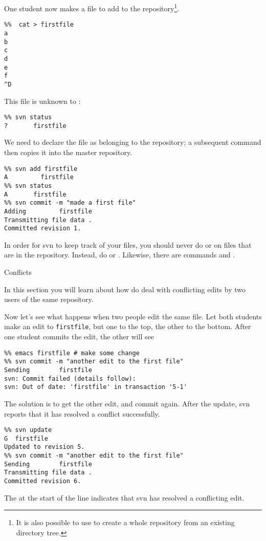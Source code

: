One student now makes a file to add to the repository\footnote{It is
  also possible to use  to create a whole repository
  from an existing directory tree.}.
\begin{verbatim}
%%  cat > firstfile
a
b
c
d
e
f
^D
\end{verbatim}
This file is unknown to :
\begin{verbatim}
%% svn status
?       firstfile
\end{verbatim}
We need to declare the file as belonging to the repository; a
subsequent  command then copies it into the master repository.
\begin{verbatim}
%% svn add firstfile 
A         firstfile
%% svn status
A       firstfile
%% svn commit -m "made a first file"
Adding         firstfile
Transmitting file data .
Committed revision 1.
\end{verbatim}



In order for svn to keep track of your files, you should never do
 or  on files that are in the repository. Instead, do
 or . Likewise, there are commands  and
.

 {Conflicts}

\begin{purpose}
  In this section you will learn about how do deal with conflicting
  edits by two users of the same repository.
\end{purpose}

Now let's see what happens when two people edit the same file.
Let both students make an edit to \verb+firstfile+, but one to the
top, the other to the bottom. After one student commits the edit, the
other will see
\begin{verbatim}
%% emacs firstfile # make some change
%% svn commit -m "another edit to the first file"
Sending        firstfile
svn: Commit failed (details follow):
svn: Out of date: 'firstfile' in transaction '5-1'
\end{verbatim}
The solution is to get the other edit, and commit again. After the
update, svn reports that it has resolved a conflict successfully.
\begin{verbatim}
%% svn update
G  firstfile
Updated to revision 5.
%% svn commit -m "another edit to the first file"
Sending        firstfile
Transmitting file data .
Committed revision 6.
\end{verbatim}
The  at the start of the line indicates that svn has resolved a
conflicting edit.

